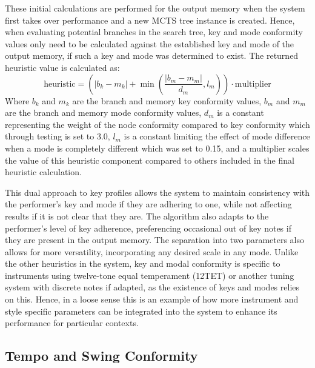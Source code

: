 These initial calculations are performed for the output memory when the system first takes over performance and a new MCTS tree instance is created. Hence, when evaluating potential branches in the search tree, key and mode conformity values only need to be calculated against the established key and mode of the output memory, if such a key and mode was determined to exist. The returned heuristic value is calculated as:
\begin{equation}
    \text{heuristic} = \left(|b_k - m_k| + \min\left(\frac{|b_m - m_m|}{d_m}, l_m\right)\right) \cdot \text{multiplier}
\end{equation}
Where $b_k$ and $m_k$ are the branch and memory key conformity values, $b_m$ and $m_m$ are the branch and memory mode conformity values, $d_m$ is a constant representing the weight of the node conformity compared to key conformity which through testing is set to 3.0, $l_m$ is a constant limiting the effect of mode difference when a mode is completely different which was set to 0.15, and a multiplier scales the value of this heuristic component compared to others included in the final heuristic calculation.

This dual approach to key profiles allows the system to maintain consistency with the performer's key and mode if they are adhering to one, while not affecting results if it is not clear that they are. The algorithm also adapts to the performer's level of key adherence, preferencing occasional out of key notes if they are present in the output memory. The separation into two parameters also allows for more versatility, incorporating any desired scale in any mode. Unlike the other heuristics in the system, key and modal conformity is specific to instruments using twelve-tone equal temperament (12TET) or another tuning system with discrete notes if adapted, as the existence of keys and modes relies on this. Hence, in a loose sense this is an example of how more instrument and style specific parameters can be integrated into the system to enhance its performance for particular contexts.

\subsection{Tempo and Swing Conformity}

